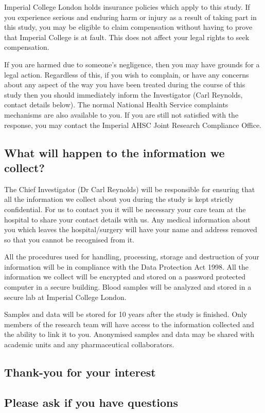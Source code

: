 \documentclass[a4paper,10pt]{article}
\begin{document}
Imperial College London holds insurance policies which apply to this study. If you experience serious and enduring harm or injury as a result of taking part in this study, you may be eligible to claim compensation without having to prove that Imperial College is at fault. This does not affect your legal rights to seek compensation.
 
If you are harmed due to someone’s negligence, then you may have grounds for a legal action. Regardless of this, if you wish to complain, or have any concerns about any aspect of the way you have been treated during the course of this study then you should immediately inform the Investigator (Carl Reynolds, contact details below). The normal National Health Service complaints mechanisms are also available to you. If you are still not satisfied with the response, you may contact the
Imperial AHSC Joint Research Compliance Office. 


\subsection*{What will happen to the information we collect?}

The Chief Investigator (Dr Carl Reynolds) will be responsible for ensuring that all the information we collect about you during the study is kept strictly confidential. For us to contact you it will be necessary your care team at the hospital to share your contact details with us. 
Any medical information about you which leaves the hospital/surgery will have your name and address removed so that you cannot be recognised from it. 

All the procedures used for handling, processing, storage and destruction of your information will be in compliance with the Data Protection Act 1998. All the information we collect will be encrypted and stored on a password protected computer in a secure building. Blood samples will be analyzed and stored in a secure lab at Imperial College London. 

Samples and data will be stored for 10 years after the study is finished. Only members of the research team will have access to the information collected and the ability to link it to you. Anonymised samples and data may be shared with academic units and any pharmaceutical collaborators.

\begin{centering}
\subsection*{Thank-you for your interest}
\subsection*{Please ask if you have questions}
\end{centering}
\end{document}
